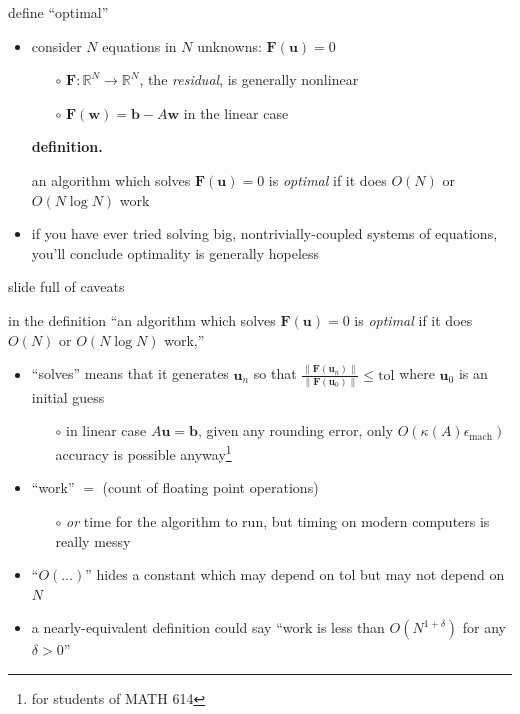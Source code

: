 \documentclass[hide notes,intlimits,usenames,dvipsnames]{beamer}
\newcommand{\RR}{\mathbb{R}}
\newcommand{\bb}{\mathbf{b}}
\newcommand{\bu}{\mathbf{u}}
\newcommand{\eps}{\epsilon}
\begin{document}
\begin{frame}{define ``optimal''}
\begin{itemize}
\item consider $N$ equations in $N$ unknowns: \qquad $\mathbf{F}(\mathbf{u}) = 0$
	\begin{itemize}
	\item[$\circ$] $\mathbf{F}:\RR^N \to \RR^N$, the \emph{residual}, is generally nonlinear
	\item[$\circ$] $\mathbf{F}(\mathbf{w}) = \mathbf{b} - A \mathbf{w}$ in the linear case
	\end{itemize}

\bigskip
\noindent \textbf{definition.}  \begin{minipage}[t]{80mm}
an algorithm which solves $\mathbf{F}(\mathbf{u}) = 0$ is \alert{\emph{optimal}} if it does $O(N)$ or $O(N\log N)$ work
\end{minipage}

\bigskip \bigskip
\item if you have ever tried solving big, nontrivially-coupled systems of equations, you'll conclude optimality is generally hopeless
\end{itemize}
\end{frame}


\begin{frame}{slide full of caveats}

in the definition ``an algorithm which solves $\mathbf{F}(\mathbf{u}) = 0$ is \emph{optimal} if it does $O(N)$ or $O(N\log N)$ work,''
\begin{itemize}
\item  ``solves'' means that it generates $\mathbf{u}_n$ so that $\frac{\|\mathbf{F}(\mathbf{u}_n)\|}{\|\mathbf{F}(\mathbf{u}_0)\|} \le \text{tol}$ where $\mathbf{u}_0$ is an initial guess
	\begin{itemize}
	\item[$\circ$] in linear case $A\bu=\bb$, given any rounding error, only $O(\kappa(A)\eps_{\text{mach}})$ accuracy is possible anyway\footnote{for students of MATH 614}
	\end{itemize}
\item ``work'' $=$ (count of floating point operations)
	\begin{itemize}
	\item[$\circ$] \emph{or} time for the algorithm to run, but timing on modern computers is really messy
	\end{itemize}
\item ``$O(\dots)$'' hides a constant which may depend on tol but may not depend on $N$
\item a nearly-equivalent definition could say ``work is less than $O(N^{1+\delta})$ for any $\delta>0$''
\end{itemize}
\end{frame}
\end{document}

